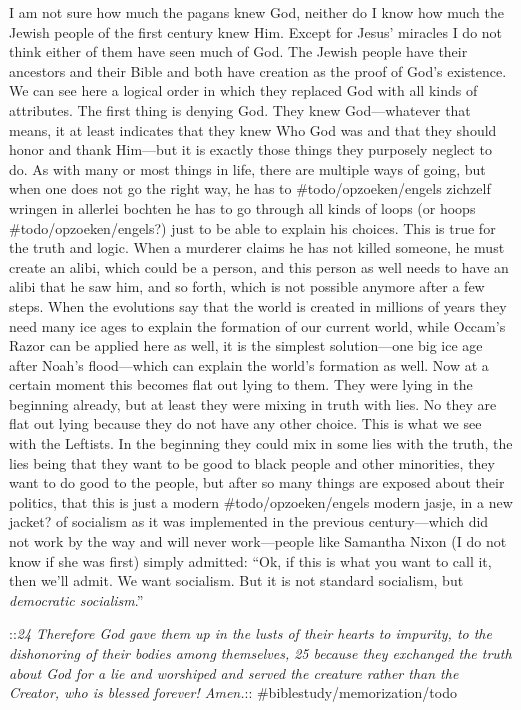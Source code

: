 I am not sure how much the pagans knew God, neither do I know how much
the Jewish people of the first century knew Him. Except for Jesus'
miracles I do not think either of them have seen much of God. The Jewish
people have their ancestors and their Bible and both have creation as
the proof of God's existence. We can see here a logical order in which
they replaced God with all kinds of attributes. The first thing is
denying God. They knew God---whatever that means, it at least indicates
that they knew Who God was and that they should honor and thank
Him---but it is exactly those things they purposely neglect to do. As
with many or most things in life, there are multiple ways of going, but
when one does not go the right way, he has to \#todo/opzoeken/engels
zichzelf wringen in allerlei bochten he has to go through all kinds of
loops (or hoops \#todo/opzoeken/engels?) just to be able to explain his
choices. This is true for the truth and logic. When a murderer claims he
has not killed someone, he must create an alibi, which could be a
person, and this person as well needs to have an alibi that he saw him,
and so forth, which is not possible anymore after a few steps. When the
evolutions say that the world is created in millions of years they need
many ice ages to explain the formation of our current world, while
Occam's Razor can be applied here as well, it is the simplest
solution---one big ice age after Noah's flood---which can explain the
world's formation as well. Now at a certain moment this becomes flat out
lying to them. They were lying in the beginning already, but at least
they were mixing in truth with lies. No they are flat out lying because
they do not have any other choice. This is what we see with the
Leftists. In the beginning they could mix in some lies with the truth,
the lies being that they want to be good to black people and other
minorities, they want to do good to the people, but after so many things
are exposed about their politics, that this is just a modern
\#todo/opzoeken/engels modern jasje, in a new jacket? of socialism as it
was implemented in the previous century---which did not work by the way
and will never work---people like Samantha Nixon (I do not know if she
was first) simply admitted: ``Ok, if this is what you want to call it,
then we'll admit. We want socialism. But it is not standard socialism,
but \emph{democratic socialism}.''

::\emph{24 Therefore God gave them up in the lusts of their hearts to
impurity, to the dishonoring of their bodies among themselves, 25
because they exchanged the truth about God for a lie and worshiped and
served the creature rather than the Creator, who is blessed forever!
Amen.}:: \#biblestudy/memorization/todo

